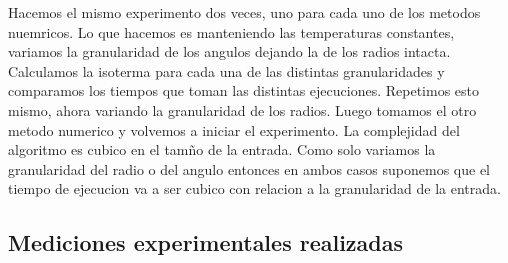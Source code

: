     


  	Hacemos el mismo experimento dos veces, uno para cada uno de los metodos nuemricos. Lo que hacemos es manteniendo las temperaturas constantes, variamos la granularidad de los angulos dejando la de los radios intacta. Calculamos la isoterma para cada una de las distintas granularidades y comparamos los tiempos que toman las distintas ejecuciones. Repetimos esto mismo, ahora variando la granularidad de los radios. Luego tomamos el otro metodo numerico y volvemos a iniciar el experimento. 
  	La complejidad del algoritmo es cubico en el tamño de la entrada. Como solo variamos la granularidad del radio o del angulo entonces en ambos casos suponemos que el tiempo de ejecucion va a ser cubico con relacion a la granularidad de la entrada.


  \subsection{Mediciones experimentales realizadas}
